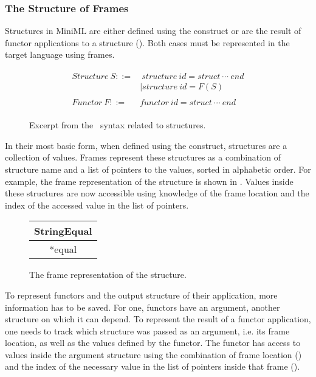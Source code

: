 \subsubsection{The Structure of Frames \label{sec:StructureOfFrames}}
Structures in MiniML are either defined using the  construct or are the result of functor applications to a structure ().
Both cases must be represented in the target language using frames.

\begin{figure}[htb]
\begin{align*}
\begin{aligned}
\mathit{Structure\ }S ::= &\ \mathit{structure\ } \mathit{id} = \mathit{struct\ }\cdots \mathit{\ end}\\
& |\mathit{structure\ } \mathit{id} = F(S)\\
\\
\mathit{Functor\ }F ::=&\mathit{functor\ } \mathit{id} = \mathit{struct\ }\cdots\mathit{\ end}
\end{aligned}
\end{align*}
\caption[\MiniML\ Structure Syntax(excerpt)]{Excerpt from the \MiniML\ syntax related to structures\label{fig:FunctorGrammarExcerpt}.}
\end{figure}

In their most basic form, when defined using the  construct, structures are a collection of values.
Frames represent these structures as a combination of structure name and a list of pointers to the values, sorted in alphabetic order.
For example, the frame representation of the  structure is shown in .
Values inside these structures are now accessible using knowledge of the frame location and the index of the accessed value in the list of pointers.

\begin{figure}[H]
\centering
\begin{tabular}{|c|}
\hline
StringEqual \\
\hline
*equal \\
\hline
\end{tabular}
\caption[Frame Representation Example]{The frame representation of the  structure.\label{fig:StringEqualFrame}}
\end{figure}

To represent functors and the output structure of their application, more information has to be saved. 
For one, functors have an argument, another structure on which it can depend.
To represent the result of a functor application, one needs to track which structure was passed as an argument, i.e. its frame location, as well as the values defined by the functor.
The functor has access to values inside the argument structure using the combination of frame location () and the index of the necessary value in the list of pointers inside that frame ().

